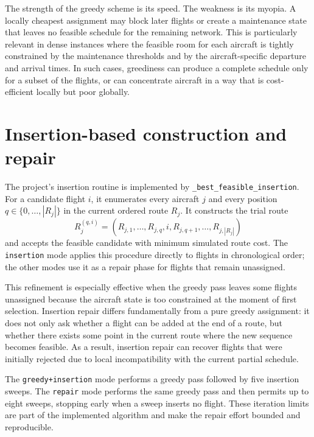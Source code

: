 The strength of the greedy scheme is its speed. The weakness is its myopia. A locally cheapest assignment may block later flights or create a maintenance state that leaves no feasible schedule for the remaining network. This is particularly relevant in dense instances where the feasible room for each aircraft is tightly constrained by the maintenance thresholds and by the aircraft-specific departure and arrival times. In such cases, greediness can produce a complete schedule only for a subset of the flights, or can concentrate aircraft in a way that is cost-efficient locally but poor globally.

\section{Insertion-based construction and repair}
\label{sec:heuristic_insertion}

The project’s insertion routine is implemented by \texttt{\_best\_feasible\_insertion}. For a candidate flight $i$, it enumerates every aircraft $j$ and every position $q \in \{0,\ldots,|R_j|\}$ in the current ordered route $R_j$. It constructs the trial route
\begin{equation}
    R_j^{(q,i)} = (R_{j,1},\ldots,R_{j,q},i,R_{j,q+1},\ldots,R_{j,|R_j|})
\end{equation}
and accepts the feasible candidate with minimum simulated route cost. The \texttt{insertion} mode applies this procedure directly to flights in chronological order; the other modes use it as a repair phase for flights that remain unassigned.

This refinement is especially effective when the greedy pass leaves some flights unassigned because the aircraft state is too constrained at the moment of first selection. Insertion repair differs fundamentally from a pure greedy assignment: it does not only ask whether a flight can be added at the end of a route, but whether there exists some point in the current route where the new sequence becomes feasible. As a result, insertion repair can recover flights that were initially rejected due to local incompatibility with the current partial schedule.

The \texttt{greedy+insertion} mode performs a greedy pass followed by five insertion sweeps. The \texttt{repair} mode performs the same greedy pass and then permits up to eight sweeps, stopping early when a sweep inserts no flight. These iteration limits are part of the implemented algorithm and make the repair effort bounded and reproducible.

